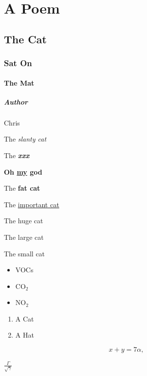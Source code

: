 \documentclass[pt11,a4paper]{book}
\begin{document}
\tableofcontents

\chapter{A Poem}
\section{The Cat}
\subsection{Sat On}
\subsubsection{The Mat}
\paragraph{Author}Chris

The \emph{slanty cat}

The \emph{\textbf{xxx}}

\textbf{Oh \underline{my} god}

The \textbf{fat cat}

The \underline{important cat}

The {\huge huge cat}

The {\large large cat}

The {\small small cat}

\begin{itemize} 
  \item VOCs
  \item CO$_2$
  \item NO$_2$
\end{itemize} 



\begin{enumerate} 
  \item A Cat 
  \item A Hat 
\end{enumerate} 



\begin{equation}
x + y = 7 \alpha,
\end{equation}



$\frac{ \Gamma }{ \sqrt{\gamma} }$

\paragraph{}
\end{document}
